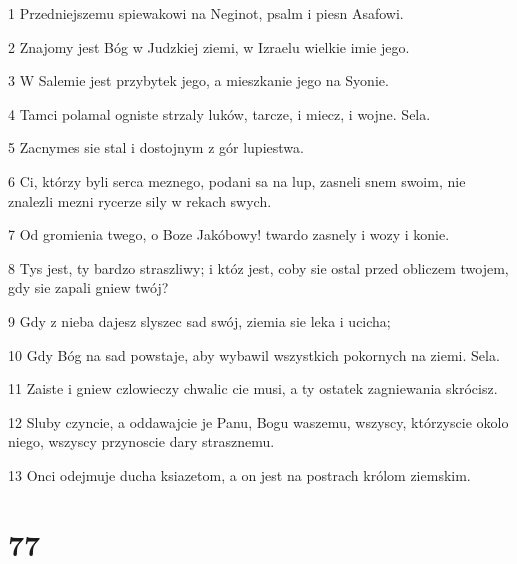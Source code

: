 \par 1 Przedniejszemu spiewakowi na Neginot, psalm i piesn Asafowi.
\par 2 Znajomy jest Bóg w Judzkiej ziemi, w Izraelu wielkie imie jego.
\par 3 W Salemie jest przybytek jego, a mieszkanie jego na Syonie.
\par 4 Tamci polamal ogniste strzaly luków, tarcze, i miecz, i wojne. Sela.
\par 5 Zacnymes sie stal i dostojnym z gór lupiestwa.
\par 6 Ci, którzy byli serca meznego, podani sa na lup, zasneli snem swoim, nie znalezli mezni rycerze sily w rekach swych.
\par 7 Od gromienia twego, o Boze Jakóbowy! twardo zasnely i wozy i konie.
\par 8 Tys jest, ty bardzo straszliwy; i któz jest, coby sie ostal przed obliczem twojem, gdy sie zapali gniew twój?
\par 9 Gdy z nieba dajesz slyszec sad swój, ziemia sie leka i ucicha;
\par 10 Gdy Bóg na sad powstaje, aby wybawil wszystkich pokornych na ziemi. Sela.
\par 11 Zaiste i gniew czlowieczy chwalic cie musi, a ty ostatek zagniewania skrócisz.
\par 12 Sluby czyncie, a oddawajcie je Panu, Bogu waszemu, wszyscy, którzyscie okolo niego, wszyscy przynoscie dary strasznemu.
\par 13 Onci odejmuje ducha ksiazetom, a on jest na postrach królom ziemskim.

\chapter{77}

